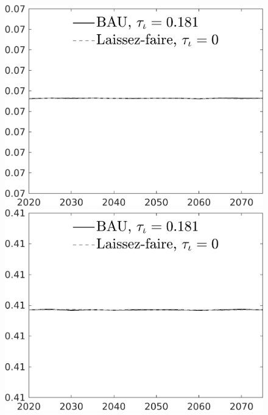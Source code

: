 \documentclass[12pt]{article}
\begin{document}
\begin{figure}[h!!]
\begin{minipage}[]{0.32\textwidth}
	\end{minipage}	
	\begin{minipage}[]{0.32\textwidth}
		\includegraphics[width=1\textwidth]{../../codding_model/own_basedOnFried/optimalPol_010922_revision/figures/all_13Sept22/CompTaul_Equlab_LFBAU_Reg0_GFF_spillover0_nsk1_xgr1_knspil1_sep1_countec0_GovRev0_etaa0.79_lgd1.png}
	\end{minipage}	
\begin{minipage}[]{0.32\textwidth}
\includegraphics[width=1\textwidth]{../../codding_model/own_basedOnFried/optimalPol_010922_revision/figures/all_13Sept22/CompTaul_Equlab_LFBAU_Reg0_LgLf_spillover0_nsk1_xgr1_knspil1_sep1_countec0_GovRev0_etaa0.79_lgd1.png}

\end{minipage}
\end{figure}
\end{document}
